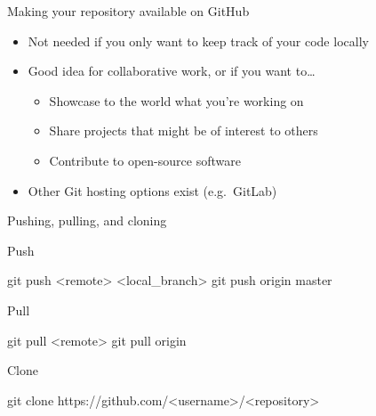 \begin{frame}{Making your repository available on GitHub}
    \begin{itemize}
        \setlength{\itemsep}{\bigskipamount}
        \item Not needed if you only want to keep track of your code locally
        \item Good idea for \alert{collaborative work}, or if you want to\ldots
              \begin{itemize}
                  \item Showcase to the world what you're working on
                  \item Share projects that might be of interest to others
                  \item Contribute to open\hyp{}source software
              \end{itemize}
        \item Other Git hosting options exist (e.g.\ GitLab)
    \end{itemize}
\end{frame}

\begin{frame}[fragile]{Pushing, pulling, and cloning}
    \vspace{1em}
    \begin{block}{Push}
        \begin{bash}
            git push <remote> <local_branch>
            git push origin master
        \end{bash}
    \end{block}
    \vspace{-0.5em}
    \begin{block}{Pull}
        \begin{bash}
            git pull <remote>
            git pull origin
        \end{bash}
    \end{block}
    \vspace{-0.5em}
    \begin{block}{Clone}
        \begin{bash}
            git clone https://github.com/<username>/<repository>
        \end{bash}
    \end{block}
\end{frame}




